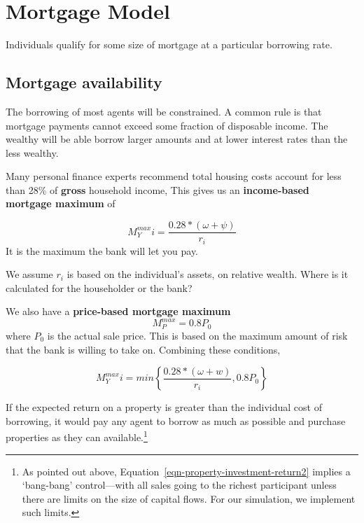 
\chapter[Mortgage Model]{Mortgage Model}

Individuals qualify for some size of mortgage at a particular borrowing rate. 
 
\section{Mortgage availability} \label{section-mortgage-availability}
The borrowing of most agents will be constrained. A common rule is that mortgage payments cannot exceed some fraction of disposable income. The wealthy will be able borrow larger amounts and at lower interest rates than the less wealthy.

Many personal finance experts recommend total housing costs account for less than 28\% of \textbf{gross} household income, This gives us an \textbf{income-based  mortgage maximum} of 

\[M^{max}_Yi = \frac{0.28*(\omega+ \psi)}{r_i}\] It is the maximum the bank will let you pay.

We assume $r_i$ is based on the individual's assets, on relative wealth. Where is it calculated for the householder or the bank?

We also have  a \textbf{price-based mortgage maximum} \[M^{max}_P = 0.8P_0\] where $P_0$ is the actual sale price. This is based on the maximum amount of risk that the bank is willing to take on. Combining these conditions, %

\[M^{max}_Yi = min\left\{\frac{0.28*(\omega+w)}{r_i},  0.8P_0 \right\} \]



If the expected return on a property is greater than the individual cost of borrowing, it would pay any agent to borrow as much as possible and purchase properties as they can available.\footnote{As pointed out above,  Equation~\ref{eqn-property-investment-return2} implies a `bang-bang' control---with all sales going to the richest participant unless there are limits on the size of capital flows. For our simulation, we implement such limits.} 
 

